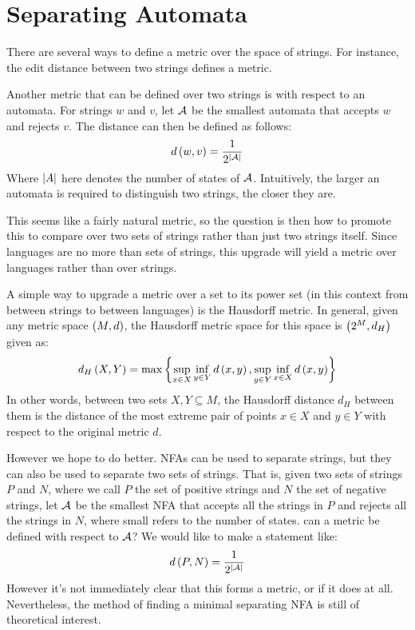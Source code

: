 
\section{Separating Automata}

There are several ways to define a metric over the space of strings.
For instance,
the edit distance between two strings defines a metric.

Another metric that can be defined over two strings is with respect to an
automata.
For strings \(w\) and \(v\),
let \(\mathcal{A}\) be the smallest automata that accepts \(w\) and rejects
\(v\).
The distance can then be defined as follows:
\begin{align*}
  d\left(w, v\right) = \frac{1}{2^{\left\lvert\mathcal{A}\right\rvert}}
\end{align*}
Where \(\left\lvert A\right\rvert\) here denotes the number of states of \(\mathcal{A}\).
Intuitively, the larger an automata is required to distinguish two strings,
the closer they are.


This seems like a fairly natural metric,
so the question is then how to promote this to
compare over two sets of strings rather than just two strings itself.
Since languages are no more than sets of strings,
this upgrade will yield a metric over languages rather than over strings.

A simple way to upgrade a metric over a set to its power set
(in this context from between strings to between languages)
is the Hausdorff metric.
In general, given any metric space \(\left(M, d\right)\),
the Hausdorff metric space for this space is \(\left(2^{M}, d_H\right)\)
given as:
\begin{align*}
  d_H\left(X, Y\right) =
    \max\left\{\sup_{x \in X} \inf_{y \in Y} d\left(x, y\right),
                \sup_{y \in Y} \inf_{x \in X} d\left(x, y\right)\right\}
\end{align*}
In other words, between two sets \(X, Y \subseteq M\),
the Hausdorff distance \(d_H\) between them is the distance of the most
extreme pair of points \(x \in X\) and \(y \in Y\)
with respect to the original metric \(d\).

However we hope to do better.
NFAs can be used to separate strings, but they can also be used to separate
two sets of strings.
That is, given two sets of strings \(P\) and \(N\),
where we call \(P\) the set of positive strings and \(N\) the set of
negative strings,
let \(\mathcal{A}\) be the smallest NFA that accepts all the strings in \(P\)
and rejects all the strings in \(N\),
where small refers to the number of states.
can a metric be defined with respect to \(\mathcal{A}\)?
We would like to make a statement like:
\begin{align*}
  d\left(P, N\right) = \frac{1}{2^{\left\lvert\mathcal{A}\right\rvert}}
\end{align*}
However it's not immediately clear that this forms a metric,
or if it does at all.
Nevertheless, the method of finding a minimal separating NFA is
still of theoretical interest.



